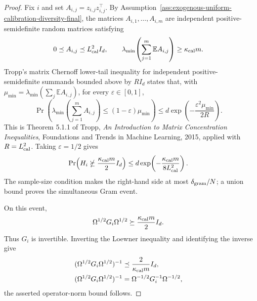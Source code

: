 \documentclass{article} %
\begin{document}
\begin{proof}
Fix \(i\) and set \(A_{i,j}=z_{i,j}z_{i,j}^{\top}\).
By Assumption~\ref{ass:exogenous-uniform-calibration-diversity-final}, the
matrices \(A_{i,1},\ldots,A_{i,m}\) are independent positive-semidefinite random
matrices satisfying
\begin{equation}
0\preceq A_{i,j}\preceq L_{\rm cal}^2 I_d,
\qquad
\lambda_{\min}\!\left(\sum_{j=1}^m\mathbb{E}A_{i,j}\right)
\geq
\kappa_{\rm cal}m.
\end{equation}
Tropp's matrix Chernoff lower-tail inequality for independent
positive-semidefinite summands bounded above by \(R I_d\) states that, with
\(\mu_{\min}=\lambda_{\min}(\sum_j\mathbb EA_{i,j})\), for every
\(\varepsilon\in[0,1]\),
\begin{equation}
\Pr\!\left(
\lambda_{\min}\!\left(\sum_{j=1}^m A_{i,j}\right)
\le
(1-\varepsilon)\mu_{\min}
\right)
\leq
d\exp\!\left(-\frac{\varepsilon^2\mu_{\min}}{2R}\right).
\end{equation}
This is Theorem 5.1.1 of Tropp, \emph{An Introduction to Matrix Concentration
Inequalities}, Foundations and Trends in Machine Learning, 2015, applied with
\(R=L_{\rm cal}^2\).  Taking \(\varepsilon=1/2\) gives
\begin{equation}
\Pr\!\left(
H_i\nsucceq \frac{\kappa_{\rm cal}m}{2}I_d
\right)
\leq
d\exp\!\left(-\frac{\kappa_{\rm cal}m}{8L_{\rm cal}^2}\right).
\end{equation}
The sample-size condition makes the right-hand side at most
\(\delta_{\rm gram}/N\); a union bound proves the simultaneous Gram event.

On this event,
\begin{equation}
\Omega^{1/2}G_i\Omega^{1/2}\succeq \frac{\kappa_{\rm cal}m}{2}I_d.
\end{equation}
Thus \(G_i\) is invertible. Inverting the Loewner inequality and identifying
the inverse give
\begin{equation}
\begin{aligned}
(\Omega^{1/2}G_i\Omega^{1/2})^{-1}
&\preceq
\frac{2}{\kappa_{\rm cal}m}I_d,
\\
(\Omega^{1/2}G_i\Omega^{1/2})^{-1}
&=
\Omega^{-1/2}G_i^{-1}\Omega^{-1/2},
\end{aligned}
\end{equation}
the asserted operator-norm bound follows.
\end{proof}
\end{document}
